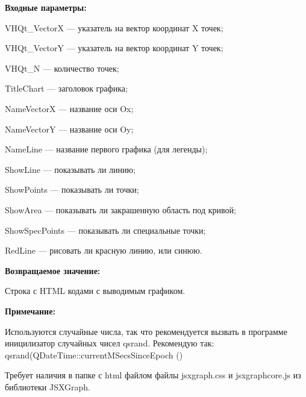 \textbf{Входные параметры:}
 
    VHQt\_VectorX --- указатель на вектор координат X точек;
 
    VHQt\_VectorY --- указатель на вектор координат Y точек;
 
    VHQt\_N --- количество точек;
 
    TitleChart --- заголовок графика;
 
    NameVectorX --- название оси Ox;
 
    NameVectorY --- название оси Oy;
 
    NameLine --- название первого графика (для легенды);
 
    ShowLine --- показывать ли линию;
 
    ShowPoints --- показывать ли точки;
 
    ShowArea --- показывать ли закрашенную область под кривой;
 
    ShowSpecPoints --- показывать ли специальные точки;
 
    RedLine --- рисовать ли красную линию, или синюю.

\textbf{Возвращаемое значение:}

Строка с HTML кодами с выводимым графиком.

\textbf{Примечание:}

Используются случайные числа, так что рекомендуется вызвать в программе иницилизатор случайных чисел qsrand. Рекомендую так: qsrand(QDateTime::currentMSecsSinceEpoch () %

Требует наличия в папке с html файлом файлы jsxgraph.css и jsxgraphcore.js из библиотеки JSXGraph.